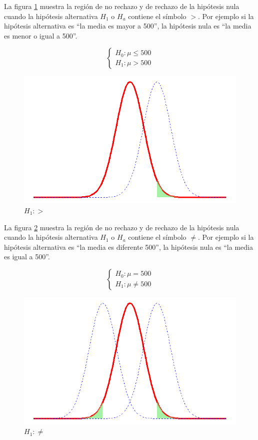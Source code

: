 \documentclass[
]{krantz}
\begin{document}
La figura \ref{fig:phmore} muestra la región de no rechazo y de rechazo de la hipótesis nula cuando la hipótesis alternativa \(H_1\) o \(H_a\) contiene el símbolo \(>\). Por ejemplo si la hipótesis alternativa es ``la media es mayor a 500'', la hipótesis nula es ``la media es menor o igual a 500''.

\begin{equation} 
\begin{cases} 
H_0: \mu \leq 500 \\ 
H_1: \mu > 500
\end{cases} 
\end{equation}

\begin{figure}[!h]

{\centering \includegraphics[width=0.6\linewidth]{phmore} 

}

\caption{$H_1:>$}\label{fig:phmore}
\end{figure}

La figura \ref{fig:ph2c} muestra la región de no rechazo y de rechazo de la hipótesis nula cuando la hipótesis alternativa \(H_1\) o \(H_a\) contiene el símbolo \(\neq\). Por ejemplo si la hipótesis alternativa es ``la media es diferente 500'', la hipótesis nula es ``la media es igual a 500''.

\begin{equation} 
\begin{cases} 
H_0: \mu =  500 \\ 
H_1: \mu \neq 500
\end{cases} 
\end{equation}

\begin{figure}[!h]

{\centering \includegraphics[width=0.6\linewidth]{ph2c} 

}

\caption{$H_1:\neq$}\label{fig:ph2c}
\end{figure}
\end{document}

